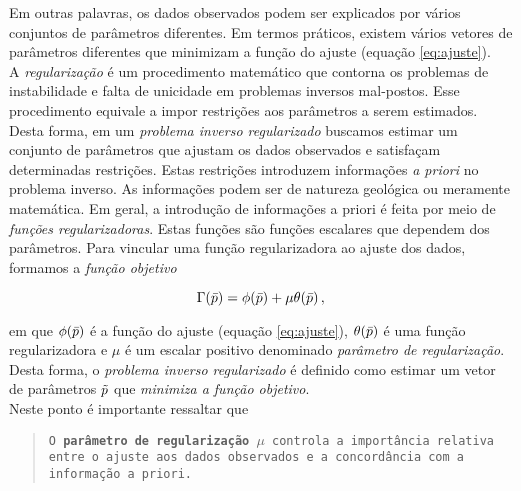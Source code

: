 \noindent Em outras palavras, os dados observados podem ser explicados por vários
conjuntos de parâmetros diferentes. Em termos práticos, existem vários vetores
de parâmetros diferentes que minimizam a função do ajuste
(equação \ref{eq:ajuste}).
\\
\indent A {\it regularização} é um procedimento matemático que contorna os
problemas de ins\-tabilidade e falta de unicidade em problemas inversos mal-postos.
Esse procedimento equivale a impor restrições aos parâmetros a serem estimados.
Desta forma, em um {\it problema inverso regularizado} buscamos estimar um
conjunto de parâmetros que ajustam os dados observados e satisfaçam
determinadas restrições.
Estas restrições introduzem informações {\it a priori} no problema inverso.
As informações podem ser de natureza geológica ou meramente matemática.
Em geral, a introdução de informações a priori é feita por meio de {\it funções
regularizadoras}.
Estas funções são funções escalares que dependem dos parâmetros.
Para vincular uma função regularizadora ao ajuste dos dados, formamos a
{\it função objetivo}

\begin{equation}
\Gamma(\bar{p}) = \phi(\bar{p}) + \mu\theta(\bar{p}) \thinspace ,
\label{eq:objetivo}
\end{equation}

\noindent em que $\phi(\bar{p})$ é a função do ajuste (equação \ref{eq:ajuste}),
$\theta(\bar{p})$ é uma função regularizadora e $\mu$ é um escalar positivo
denominado {\it parâmetro de regularização}.
Desta forma, o {\it problema inverso regularizado} é definido como estimar um
vetor de parâmetros $\tilde{p}$ que {\it minimiza a função objetivo}.
\\
\indent Neste ponto é importante ressaltar que

\begin{quote}
{\tt O {\bf parâmetro de regularização} $\mu$ controla a importância relativa
en\-tre o ajuste aos dados observados e a concordância com a infor\-ma\-ção
a priori.}
\end{quote}


